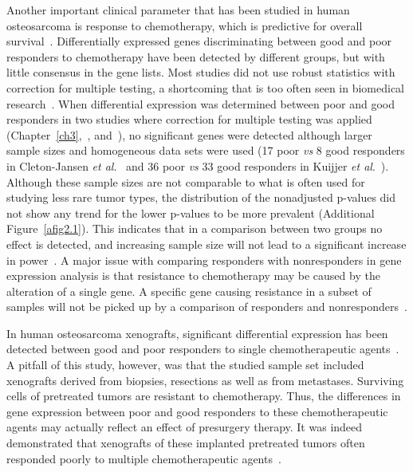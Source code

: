 Another important clinical parameter that has been studied
in human osteosarcoma is response to chemotherapy,
which is predictive for overall survival~\cite{bacci1998predictive,huvos1991bone,bacci2006prognostic}. Differentially
expressed genes discriminating between good and poor responders
to chemotherapy have been detected by different
groups, but with little consensus in the gene lists. Most studies
did not use robust statistics with correction for multiple
testing, a shortcoming that is too often seen in biomedical
research~\cite{dupuy2007critical}. When differential expression was determined
between poor and good responders in two studies where correction
for multiple testing was applied (Chapter~\ref{ch3},~\cite{kuijjer2011mrna}, and~\cite{cleton2009profiling}), no significant
genes were detected although larger sample sizes and homogeneous
data sets were used (17 poor {\it vs} 8 good responders
in Cleton-Jansen {\it et al}.~\cite{cleton2009profiling} and 36 poor {\it vs} 33 good responders
in Kuijjer {\it et al}.~\cite{kuijjer2011mrna}). Although these sample sizes are not comparable
to what is often used for studying less rare tumor
types, the distribution of the nonadjusted p-values did not
show any trend for the lower p-values to be more prevalent
(Additional Figure~\ref{afig2.1}). This indicates that in a comparison
between two groups no effect is detected, and increasing
sample size will not lead to a significant increase in power~\cite{van2009relative}. A
major issue with comparing responders with nonresponders in
gene expression analysis is that resistance to chemotherapy may
be caused by the alteration of a single gene. A specific gene
causing resistance in a subset of samples will not be picked up
by a comparison of responders and nonresponders~\cite{borst2010predictive}.

In human osteosarcoma xenografts, significant differential
expression has been detected between good and poor responders
to single chemotherapeutic agents~\cite{bruheim2009gene}. A pitfall of this
study, however, was that the studied sample set included xenografts
derived from biopsies, resections as well as from metastases.
Surviving cells of pretreated tumors are resistant to
chemotherapy. Thus, the differences in gene expression
between poor and good responders to these chemotherapeutic
agents may actually reflect an effect of presurgery therapy.
It was indeed demonstrated that xenografts of these
implanted pretreated tumors often responded poorly to multiple
chemotherapeutic agents~\cite{bruheim2004human}.

